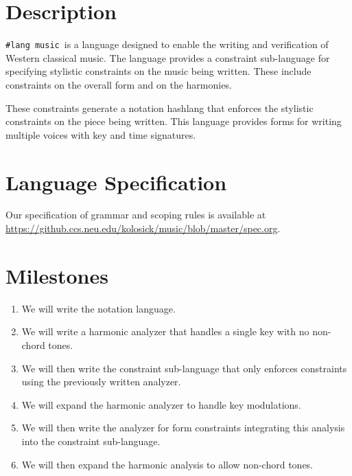 \documentclass{article}
\author{Gentner, Jared
\and Kolosick, Matthew}
\title{\music}
\date{}
\newcommand{\music}{\texttt{\#lang music}}
\begin{document}
\maketitle{}

\section{Description}

\music\ is a language designed to enable the writing and verification of Western
classical music. The language provides a constraint sub-language for specifying
stylistic constraints on the music being written. These include constraints on
the overall form and on the harmonies.

These constraints generate a notation hashlang that enforces the stylistic
constraints on the piece being written. This language provides forms for writing
multiple voices with key and time signatures.

\section{Language Specification}

Our specification of grammar and scoping rules is available at
\url{https://github.ccs.neu.edu/kolosick/music/blob/master/spec.org}.

\section{Milestones}

\begin{enumerate}
  \item We will write the notation language.
  \item We will write a harmonic analyzer that handles a single key with no
    non-chord tones.
  \item We will then write the constraint sub-language that only enforces
    constraints using the previously written analyzer.
  \item We will expand the harmonic analyzer to handle key modulations.
  \item We will then write the analyzer for form constraints integrating this
    analysis into the constraint sub-language.
  \item We will then expand the harmonic analysis to allow non-chord tones.
\end{enumerate}
\end{document}

